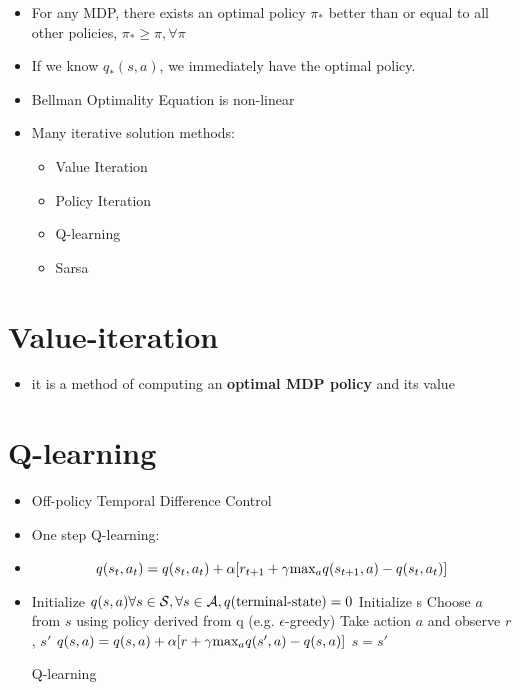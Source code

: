 \documentclass[../main.tex]{subfiles}
\begin{document}
\begin{itemize}
  \item For any MDP, there exists an optimal policy $\pi_{*}$ better than or equal to all other policies, $\pi_{*} \geq \pi, \forall \pi$
  \item If we know $q_{*}(s,a)$, we immediately have the optimal policy.

  \item Bellman Optimality Equation is non-linear
  \item Many iterative solution methods:
  \begin{itemize}
    \item Value Iteration
    \item Policy Iteration
    \item Q-learning
    \item Sarsa
  \end{itemize}

\end{itemize}

\section{Value-iteration}

\begin{itemize}
  \item it is a method of computing an \textbf{optimal MDP policy} and its value
\end{itemize}

\section{Q-learning}
\begin{itemize}
  \item Off-policy Temporal Difference Control
  \item One step Q-learning:
  \item \begin{equation*}
    q(s_{t}, a_{t}) = q(s_{t}, a_{t}) + \alpha[r_{t+1} + \gamma \text{max}_{a}q(s_{t+1}, a) - q(s_{t}, a_{t})]
  \end{equation*}
  \item \begin{algorithm}[H]
      \SetAlgoLined
      Initialize $q(s,a) \forall s \in \mathcal{S}, \forall s \in \mathcal{A}, q(\text{terminal-state}) = 0$ \;
       {
        Initialize s\;
         {
          Choose $a$ from $s$ using policy derived from q (e.g. $\epsilon$-greedy)\;
          Take action $a$ and observe $r$, $s'$\;
          $q(s,a) = q(s,a) + \alpha[r + \gamma \text{max}_{a} q(s', a) - q(s,a)]$\;
          $s = s'$\;
        }
      }
      \caption{Q-learning}
  \end{algorithm}
\end{itemize}
\end{document}

